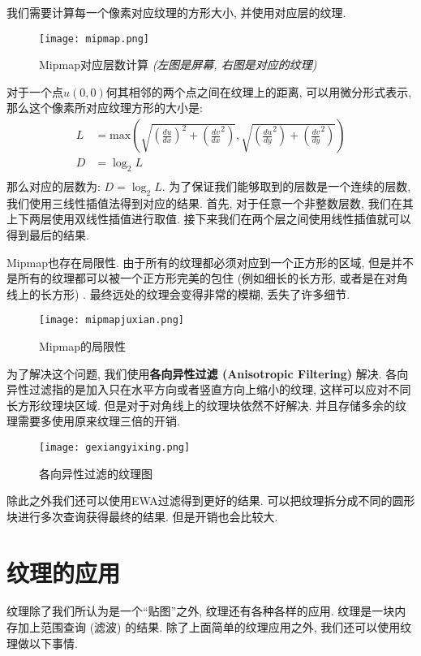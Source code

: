 我们需要计算每一个像素对应纹理的方形大小, 并使用对应层的纹理. 
\begin{figure}[H]
	\centering
	\texttt{[image: mipmap.png]}
	\caption{Mipmap对应层数计算 \textit{(左图是屏幕, 右图是对应的纹理)}
    }
	\label{fig:mipmap}
\end{figure}
对于一个点$u(0,0)$何其相邻的两个点之间在纹理上的距离, 可以用微分形式表示, 那么这个像素所对应纹理方形的大小是: 
\begin{equation}
    \begin{aligned}
	L&= \text{max}(\sqrt{(\frac{du}{dx})^2+(\frac{dv}{dx}^2)},\sqrt{(\frac{du}{dy}^2)+(\frac{dv}{dy}^2)}) \\
    D&=\log_2L \\
    \end{aligned}
\end{equation}
那么对应的层数为: $D=\log_2L$. 
为了保证我们能够取到的层数是一个连续的层数, 我们使用三线性插值法得到对应的结果. 首先, 对于任意一个非整数层数, 我们在其上下两层使用双线性插值进行取值. 接下来我们在两个层之间使用线性插值就可以得到最后的结果. 

Mipmap也存在局限性. 由于所有的纹理都必须对应到一个正方形的区域, 但是并不是所有的纹理都可以被一个正方形完美的包住 (例如细长的长方形, 或者是在对角线上的长方形) . 最终远处的纹理会变得非常的模糊, 丢失了许多细节. 
\begin{figure}[H]
	\centering
	\texttt{[image: mipmapjuxian.png]}
	\caption{Mipmap的局限性}
	\label{fig:mipmapjuxian}
\end{figure}
为了解决这个问题, 我们使用\textbf{各向异性过滤 (Anisotropic Filtering) }解决. 各向异性过滤指的是加入只在水平方向或者竖直方向上缩小的纹理, 这样可以应对不同长方形纹理块区域. 但是对于对角线上的纹理块依然不好解决. 并且存储多余的纹理需要多使用原来纹理三倍的开销. 
\begin{figure}[H]
	\centering
	\texttt{[image: gexiangyixing.png]}
	\caption{各向异性过滤的纹理图}
	\label{fig:gexiangyixing}
\end{figure}
除此之外我们还可以使用EWA过滤得到更好的结果. 可以把纹理拆分成不同的圆形块进行多次查询获得最终的结果. 但是开销也会比较大. 

\section{纹理的应用}
纹理除了我们所认为是一个“贴图”之外, 纹理还有各种各样的应用. 纹理是一块内存加上范围查询 (滤波) 的结果. 除了上面简单的纹理应用之外, 我们还可以使用纹理做以下事情. 

